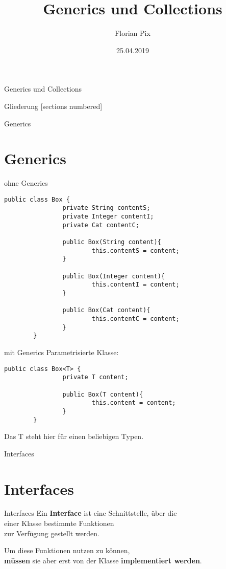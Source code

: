 \documentclass[10pt]{beamer}
\author{Florian Pix}
\institute{SWT Übung SoSe19}
\title{Generics und Collections}
\date{25.04.2019}
\begin{document}
\begin{frame}{Generics und Collections}
    \titlepage
\end{frame}

\begin{frame}{Gliederung}
    [sections numbered]
    \tableofcontents
\end{frame}

\begin{frame}[fragile]{Generics}
    \section{Generics}
\end{frame}

\begin{frame}[fragile]{ohne Generics}
\begin{lstlisting}[basicstyle=\ttfamily\scriptsize,gobble=8]
		public class Box {
				private String contentS;
				private Integer contentI;
				private Cat contentC;

				public Box(String content){
						this.contentS = content;
				}

				public Box(Integer content){
						this.contentI = content;
				}

				public Box(Cat content){
						this.contentC = content;
				}
		}
\end{lstlisting}
\end{frame}

\begin{frame}[fragile]{mit Generics}
Parametrisierte Klasse:

\begin{lstlisting}[basicstyle=\ttfamily\scriptsize,gobble=8]
		public class Box<T> {
				private T content;

				public Box(T content){
						this.content = content;
				}
		}
\end{lstlisting}

Das T steht hier für einen beliebigen Typen.
\end{frame}

\begin{frame}[fragile]{Interfaces}
    \section{Interfaces}
\end{frame}

\begin{frame}[fragile]{Interfaces}
Ein  \textcolor{mygreen}{\textbf{Interface}} ist eine Schnittstelle, über die\\ 
einer Klasse bestimmte Funktionen \\
zur Verfügung gestellt werden.

Um diese Funktionen nutzen zu können, \\
 \textcolor{mymauve}{\textbf{müssen}} sie aber erst von der Klasse  \textcolor{mymauve}{\textbf{implementiert werden}}. \\
\end{frame}
\end{document}
